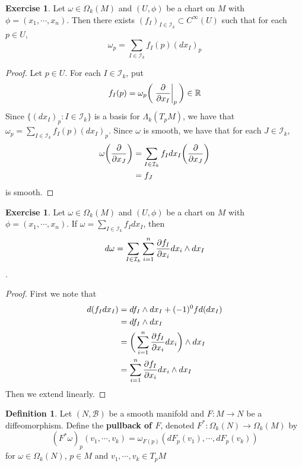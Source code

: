 \documentclass[12pt]{amsart}
\theoremstyle{definition}
\newtheorem{defn}[definition]{Definition}
\theoremstyle{remark}
\theoremstyle{definition}
\newtheorem{ex}[definition]{Exercise}
\newcommand{\Lam}{\Lambda}
\newcommand{\om}{\omega}
\newcommand{\Om}{\Omega}
\newcommand{\R}{\mathbb{R}}
\newcommand{\MB}{\mathcal{B}}
\newcommand{\MI}{\mathcal{I}}
\begin{document}
	\begin{ex}
		Let $\om \in \Om_k(M)$ and $(U, \phi)$ be a chart on $M$ with $\phi = (x_1, \cdots, x_n)$. Then there exists $(f_I)_{I \in \MI_k} \subset C^{\infty}(U)$ such that for each $p \in U$, $$\om_p = \sum_{I \in \MI_k}f_I(p) (dx_I)_p$$
	\end{ex}

	\begin{proof}
		Let $p \in U$. For each $I \in \MI_k$, put $$f_I(p) = \om_p \bigg (  \eval{\pdv{x_I}}_{p} \bigg) \in \R$$ 
		Since $\{(dx_I)_p: I \in \MI_k\}$ is a basis for $\Lam_k(T_pM)$, we have that $\om_p = \sum\limits_{I \in \MI_k} f_I(p) (dx_I)_p$. Since $\om$ is smooth, we have that for each $J \in \MI_k$, 
		\begin{align*}
			\om\bigg (\pdv{x_J} \bigg ) 
			&= \sum\limits_{I \in \MI_k} f_I dx_I \bigg (\pdv{x_J} \bigg) \\
			&= f_J
		\end{align*} is smooth.
	\end{proof}

	\begin{ex}
		Let $\om \in \Om_k(M)$ and $(U, \phi)$ be a chart on $M$ with $\phi = (x_1, \cdots, x_n)$. If $\om = \sum\limits_{I \in \MI_k}f_I dx_I$, then $$d \om  = \sum_{I \in \MI_k} \sum_{i =1}^n \pdv{f_I}{x_i} dx_i \wedge dx_I$$.
	\end{ex}

	\begin{proof}
		First we note that
		\begin{align*}
			d(f_I dx_I) 
			&= df_I \wedge dx_I + (-1)^0 f d(dx_I) \\
			&= df_I \wedge dx_I \\
			&= \bigg( \sum\limits_{i=1}^n \pdv{f_I}{x_i}dx_i  \bigg) \wedge dx_I \\
			&= \sum\limits_{i=1}^n {\pdv{f_I}{x_i}}dx_i \wedge dx_I \\
		\end{align*}
		Then we extend linearly.
	\end{proof}
	
	
	\begin{defn}
		Let $(N, \MB)$ be a smooth manifold and $F: M \rightarrow N$ be a diffeomorphism. Define the \textbf{pullback of $F$}, denoted $F^*: \Om_k(N) \rightarrow \Om_k(M)$ by  $$(F^* \om)_p (v_1, \cdots, v_k) = \om_{F(p)} (dF_p(v_1), \cdots, dF_p(v_k))$$ for $\om \in \Om_k(N)$, $p \in M$ and $v_1, \cdots, v_k \in T_{p}M$
	\end{defn}
\end{document}
